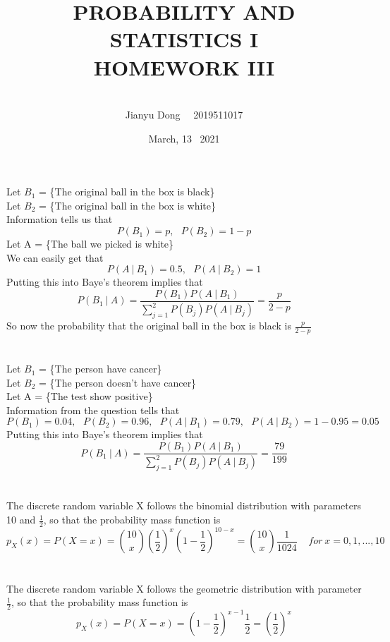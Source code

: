 \documentclass[10.5pt]{article}
\title{PROBABILITY AND STATISTICS I
\\HOMEWORK III}
\author{\\Jianyu Dong   ~~2019511017}
\date{March, 13~ 2021}
\begin{document}
\maketitle
\newpage   
\section{}
Let $B_1$ = \{The original ball in the box is black\}\\\indent
Let $B_2$ = \{The original ball in the box is white\}\\\indent
Information tells us that$$P(B_1) = p, ~~~ P(B_2) = 1-p$$\indent
Let A = \{The ball we picked is white\}\\\indent
We can easily get that$$P(A~|~B_1) = 0.5, ~~~ P(A~|~B_2) = 1$$\indent
Putting this into Baye's theorem implies that$$P(B_1~|~A) = \frac{P(B_1)P(A~|~B_1)}{\sum_{j = 1}^{2} P(B_j)P(A~|~B_j) } = \frac{p}{2-p}$$\indent
So now the probability that the original ball in the box is black is $\frac{p}{2-p}$

\section{}
Let $B_1$ = \{The person have cancer\}\\\indent
Let $B_2$ = \{The person doesn't have cancer\}\\\indent
Let A = \{The test show positive\}\\\indent
Information from the question tells that$$P(B_1) = 0.04, ~~~P(B_2) = 0.96, ~~~ P(A~|~B_1) = 0.79, ~~~ P(A~|~B_2) = 1 - 0.95 = 0.05$$\indent 
Putting this into Baye's theorem implies that$$P(B_1~|~A) = \frac{P(B_1)P(A~|~B_1)}{\sum_{j = 1}^{2} P(B_j)P(A~|~B_j) } = \frac{79}{199}$$

\section{}
The discrete random variable X follows the binomial distribution with parameters 10 and $\frac{1}{2}$, so that the probability mass function is$$p_X(x) = P(X = x) = \binom{10}{x} (\frac{1}{2})^x(1-\frac{1}{2})^{10-x} = \binom{10}{x}\frac{1}{1024} ~~~~~ for ~x = 0,1,...,10$$

\section{}
The discrete random variable X follows the geometric distribution with parameter $\frac{1}{2}$, so that the probability mass function is $$p_X(x) = P(X=x) = (1-\frac{1}{2})^{x-1}\frac{1}{2} = (\frac{1}{2})^x$$
\end{document}
